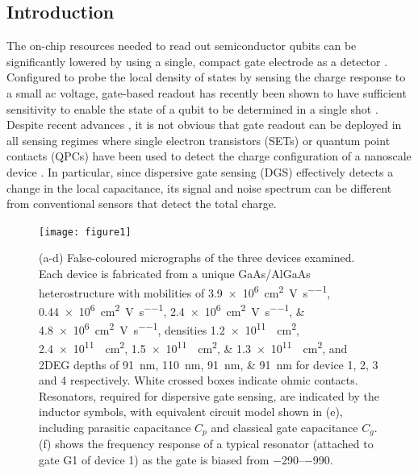\subsection{Introduction}

The on-chip resources needed to read out semiconductor qubits can be significantly lowered by using a single, compact gate electrode as a detector \cite{Colless_PRL}. Configured to probe the local density of states by sensing the charge response to a small ac voltage, gate-based readout has recently been shown to have sufficient sensitivity to enable the state of a qubit to be determined in a single shot \cite{Nnano_dzurak}. Despite recent advances \cite{fernando1,PhysRevApplied.10.014018,PhysRevX.8.041032}, it is not obvious that gate readout can be deployed in all sensing regimes where single electron transistors (SETs) or quantum point contacts (QPCs) have been used to detect the charge configuration of a nanoscale device \cite{Reilly:2007ig,Devoret_schoel}. In particular, since dispersive gate sensing (DGS) effectively detects a change in the local capacitance, its signal and noise spectrum can be different from conventional sensors that detect the total charge.

\begin{figure}
\texttt{[image: figure1]}
\caption{\label{fig:pock_fig1} (a-d) False-coloured micrographs of the three devices examined. Each device is fabricated from a unique GaAs/AlGaAs heterostructure with mobilities of \SIlist[list-units=single]{3.9e6;0.44e6;2.4e6;4.8e6}{\square\centi\meter\per\volt\per\second}, densities \SIlist[list-units = single]{1.2e11;2.4e11;1.5e11;1.3e11}{\per\square\centi\meter}, and 2DEG depths of \SIlist{91;110;91;91}{\nano\meter} for device 1, 2, 3 and 4 respectively. White crossed boxes indicate ohmic contacts. Resonators, required for dispersive gate sensing, are indicated by the inductor symbols, with equivalent circuit model shown in (e), including parasitic capacitance $C_p$ and classical gate capacitance $C_g$. (f) shows the frequency response of a typical resonator (attached to gate G1 of device 1) as the gate is biased from \SIrange{-290}{-990}{\mv}.}
\end{figure}

